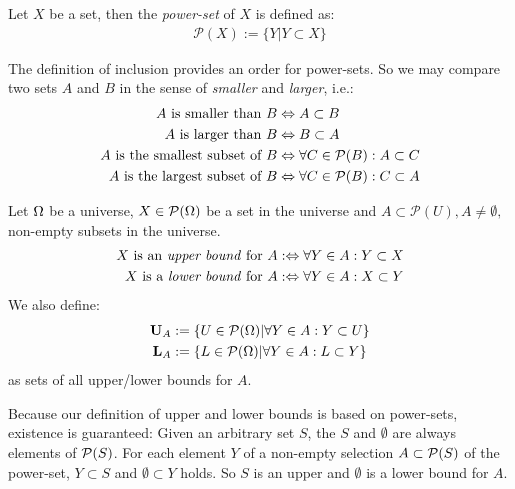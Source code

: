 \begin{definition}
\label{definition:PowerSet}
Let $X$ be a set, then the \emph{power-set} of $X$ is defined as:
\begin{align}
\mathcal{P}(X) := \{ Y | Y \subset X \}
\end{align}
\end{definition}

The definition of inclusion provides an order for power-sets.
So we may compare two sets $A$ and $B$ in the sense of \emph{smaller} and \emph{larger}, i.e.:
\begin{align}
A \text{ is smaller than } B 
&\Leftrightarrow A \subset B
\\
A \text{ is larger than } B  
&\Leftrightarrow B \subset A
\\
A \text{ is the smallest subset of } B
&\Leftrightarrow \forall C \in \mathcal{P}(B) : A \subset C
\\
A \text{ is the largest subset of } B
&\Leftrightarrow \forall C \in \mathcal{P}(B) : C \subset A
\end{align}


\begin{definition}
Let $\Omega$ be a universe, $X \in \mathcal{P}(\Omega)$ be a set in the universe and $A \subset \mathcal{P}(U), A \neq \emptyset,$ non-empty subsets in the universe.
\begin{align}
X \text{ is an \emph{upper bound} for } A
&:\Leftrightarrow
\forall Y \in A : Y \subset X
\\
X \text{ is a \emph{lower bound} for } A
&:\Leftrightarrow
\forall Y \in A : X \subset Y
\end{align}
We also define:
\begin{align}
\mathbf{U}_A 
&:= \{ U \in \mathcal{P}(\Omega) | \forall Y \in A : Y \subset U \}
\\
\mathbf{L}_A
&:= \{ L \in \mathcal{P}(\Omega) | \forall Y \in A : L \subset Y \}
\end{align}
as sets of all upper/lower bounds for $A$.
\end{definition}

Because our definition of upper and lower bounds is based on power-sets, existence is guaranteed:
Given an arbitrary set $S$, the $S$ and $\emptyset$ are always elements of $\mathcal{P}(S)$.
For each element $Y$ of a non-empty selection $A \subset \mathcal{P}(S)$ of the power-set, $Y \subset S$ and $\emptyset \subset Y$ holds.
So $S$ is an upper and $\emptyset$ is a lower bound for $A$.

